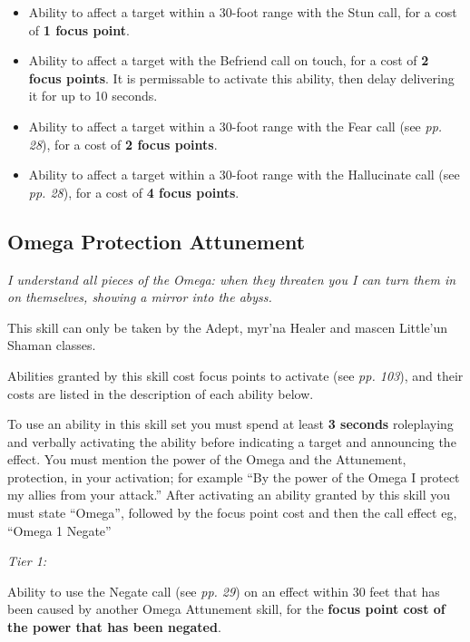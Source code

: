 \begin{itemize}
\item Ability to affect a target within a 30-foot range with the Stun call, for a cost of \textbf{1 focus point}.

\item Ability to affect a target with the Befriend call on touch, for a cost of \textbf{2 focus points}. It is permissable to activate this ability, then delay delivering it for up to 10 seconds.

\item Ability to affect a target within a 30-foot range with the Fear call (see \textit{pp. 28}), for a cost of \textbf{2 focus points}.

\item Ability to affect a target within a 30-foot range with the Hallucinate call (see \textit{pp. 28}), for a cost of \textbf{4 focus points}.

\end{itemize}
\subsection{Omega Protection Attunement}

\textit{I understand all pieces of the Omega: when they threaten you I can turn them in on themselves, showing a mirror into the abyss.}

This skill can only be taken by the Adept, myr'na Healer and mascen Little'un Shaman classes.

Abilities granted by this skill cost focus points to activate (see \textit{pp. 103}), and their costs are listed in the description of each ability below.

To use an ability in this skill set you must spend at least \textbf{3 seconds} roleplaying and verbally activating the ability before indicating a target and announcing the effect. You must mention the power of the Omega and the Attunement, protection, in your activation; for example ``By the power of the Omega I protect my allies from your attack.'' After activating an ability granted by this skill you must state ``Omega'', followed by the focus point cost and then the call effect eg, ``Omega 1 Negate''

\textit{Tier 1:}

Ability to use the Negate call (see \textit{pp. 29}) on an effect within 30 feet that has been caused by another Omega Attunement skill, for the \textbf{focus point cost of the power that has been negated}.

